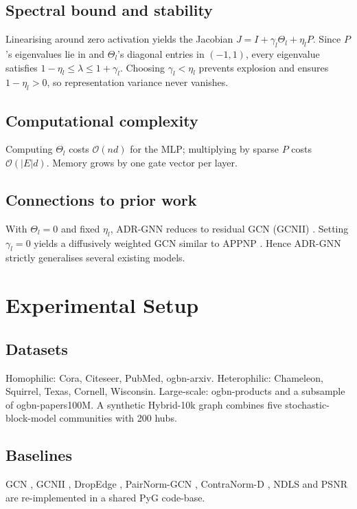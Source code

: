 \documentclass{article}
\begin{document}
\subsection{Spectral bound and stability}
Linearising around zero activation yields the Jacobian \(J = I + \gamma_l \Theta_l + \eta_l P\). Since \(P\)’s eigenvalues lie in  and \(\Theta_l\)’s diagonal entries in \((-1,1)\), every eigenvalue satisfies \(1-\eta_l \le \lambda \le 1+\gamma_l\). Choosing \(\gamma_l < \eta_l\) prevents explosion and ensures \(1-\eta_l > 0\), so representation variance never vanishes.

\subsection{Computational complexity}
Computing \(\Theta_l\) costs \(\mathcal{O}(n d)\) for the MLP; multiplying by sparse \(P\) costs \(\mathcal{O}(|E| d)\). Memory grows by one gate vector per layer.

\subsection{Connections to prior work}
With \(\Theta_l = 0\) and fixed \(\eta_l\), ADR-GNN reduces to residual GCN (GCNII) \cite{chen-2020-simple}. Setting \(\gamma_l = 0\) yields a diffusively weighted GCN similar to APPNP \cite{gasteiger-2018-predict}. Hence ADR-GNN strictly generalises several existing models.

\section{Experimental Setup}
\subsection{Datasets}
Homophilic: Cora, Citeseer, PubMed, ogbn-arxiv. Heterophilic: Chameleon, Squirrel, Texas, Cornell, Wisconsin. Large-scale: ogbn-products and a subsample of ogbn-papers100M. A synthetic Hybrid-10k graph combines five stochastic-block-model communities with 200 hubs.

\subsection{Baselines}
GCN \cite{kipf-2016-semi}, GCNII \cite{chen-2020-simple}, DropEdge \cite{rong-2019-dropedge}, PairNorm-GCN \cite{zhao-2019-pairnorm}, ContraNorm-D \cite{guo-2023-contranorm}, NDLS \cite{zhang-2021-node} and PSNR \cite{zhou-2023-deep} are re-implemented in a shared PyG code-base.
\end{document}
